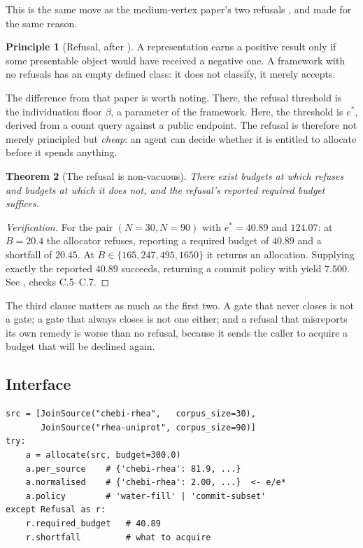 \documentclass[11pt,twocolumn,a4paper]{article}
\theoremstyle{thmstyle}
\newtheorem{theorem}{Theorem}[section]
\theoremstyle{definition}
\newtheorem{principle}[theorem]{Principle}
\theoremstyle{remark}
\newcommand{\estar}{e^{*}}
\begin{document}
This is the same move as the medium-vertex paper's two refusals
\citep{sachikonye2026medium}, and made for the same reason.

\begin{principle}[Refusal, after \citealp{sachikonye2026medium}]
\label{prin:refusal}
A representation earns a positive result only if some presentable object
would have received a negative one. A framework with no refusals has an
empty defined class: it does not classify, it merely accepts.
\end{principle}

The difference from that paper is worth noting. There, the refusal
threshold is the individuation floor $\beta$, a parameter of the
framework. Here, the threshold is $\estar$, derived from a count query
against a public endpoint. The refusal is therefore not merely principled
but \emph{cheap}: an agent can decide whether it is entitled to allocate
before it spends anything.

\begin{theorem}[The refusal is non-vacuous]
\label{thm:refusal-nonvacuous}
There exist budgets at which  refuses and budgets at
which it does not, and the refusal's reported required budget suffices.
\end{theorem}

\begin{proof}[Verification]
For the pair $(N=30, N=90)$ with $\estar=40.89$ and $124.07$: at
$B=20.4$ the allocator refuses, reporting a required budget of $40.89$
and a shortfall of $20.45$. At $B\in\{165,247,495,1650\}$ it returns an
allocation. Supplying exactly the reported $40.89$ succeeds, returning a
commit policy with yield $7.500$. See , checks
C.5--C.7.
\end{proof}

The third clause matters as much as the first two. A gate that never
closes is not a gate; a gate that always closes is not one either; and a
refusal that misreports its own remedy is worse than no refusal, because
it sends the caller to acquire a budget that will be declined again.

\subsection{Interface}

\begin{lstlisting}
src = [JoinSource("chebi-rhea",   corpus_size=30),
       JoinSource("rhea-uniprot", corpus_size=90)]
try:
    a = allocate(src, budget=300.0)
    a.per_source    # {'chebi-rhea': 81.9, ...}
    a.normalised    # {'chebi-rhea': 2.00, ...}  <- e/e*
    a.policy        # 'water-fill' | 'commit-subset'
except Refusal as r:
    r.required_budget   # 40.89
    r.shortfall         # what to acquire
\end{lstlisting}
\end{document}
